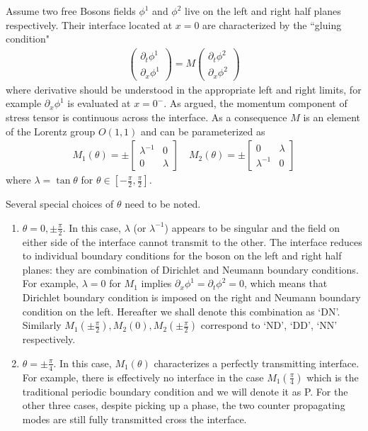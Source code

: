 Assume two free Bosons fields $\phi^1$ and $\phi^2$ live on the left and right half planes respectively. Their interface located at $x = 0$ are characterized by the ``gluing condition"
\begin{equation}\begin{aligned}
\label{eq:def_M}
\begin{pmatrix}
\partial_t\phi^1\\
\partial_x\phi^1
\end{pmatrix}
=M\begin{pmatrix}
\partial_t\phi^2\\
\partial_x\phi^2
\end{pmatrix}
\end{aligned}\end{equation}
where derivative should be understood in the appropriate left and right limits, for example $\partial_x \phi^1$ is evaluated at $ x = 0^-$. As argued, the momentum component of stress tensor is continuous across the interface. As a consequence $M$ is an element of the Lorentz group $O(1,1)$ and can be parameterized as
\begin{equation}\begin{aligned}
\label{eq:M1M2}
M_1(\theta)=\pm
\begin{bmatrix}
\lambda^{-1} & 0 \\
0 & \lambda
\end{bmatrix}\quad
M_2(\theta)=\pm
\begin{bmatrix}
0 & \lambda  \\
\lambda^{-1} & 0 
\end{bmatrix}
\end{aligned}\end{equation}
where $\lambda=\tan\theta$ for $\theta\in\left[-\frac{\pi}{2},\frac{\pi}{2}\right]$. 

Several special choices of $\theta$ need to be noted. 
\begin{enumerate}
\item $\theta=0,\pm \frac{\pi}{2}$. In this case, $\lambda$ (or $\lambda^{-1}$) appears to be singular and the field on either side of the interface cannot transmit to the other. The interface reduces to individual boundary conditions for the boson on the left and right half planes: they are combination of Dirichlet and Neumann boundary conditions. For example, $\lambda = 0$ for $M_1$ implies $\partial_x\phi^1 = \partial_t\phi^2 =0$, which means that Dirichlet boundary condition is imposed on the right and Neumann boundary condition on the left. Hereafter we shall denote this combination as `DN'. Similarly $M_1(\pm\frac{\pi}{2}),M_2(0),M_2(\pm \frac{\pi}{2})$ correspond to `ND', `DD', `NN' respectively. 
\item $\theta = \pm \frac{\pi}{4}$. In this case, $M_1(\theta)$ characterizes a perfectly transmitting interface. For example, there is effectively no interface in the case $M_1( \frac{\pi}{4})$ which is the traditional periodic boundary condition and we will denote it as P. For the other three cases, despite picking up a phase, the two counter propagating modes are still fully transmitted cross the interface. 
\end{enumerate}

